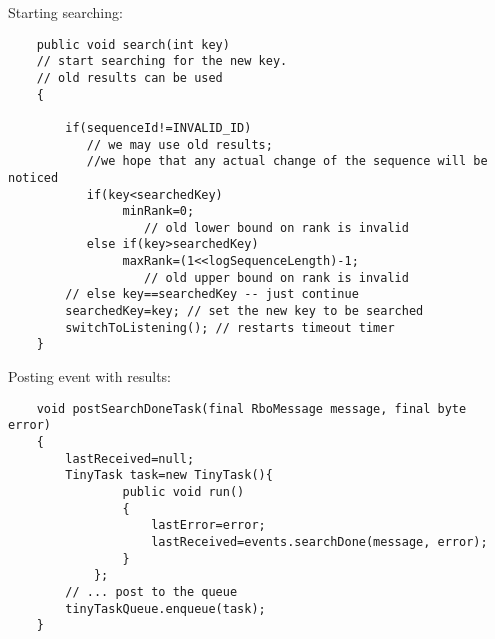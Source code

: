 \documentclass{letter}
\begin{document}
Starting searching:
\begin{verbatim}
    public void search(int key) 
    // start searching for the new key. 
    // old results can be used
    {

        if(sequenceId!=INVALID_ID) 
           // we may use old results; 
           //we hope that any actual change of the sequence will be noticed
           if(key<searchedKey)
                minRank=0; 
                   // old lower bound on rank is invalid
           else if(key>searchedKey)
                maxRank=(1<<logSequenceLength)-1; 
                   // old upper bound on rank is invalid
        // else key==searchedKey -- just continue
        searchedKey=key; // set the new key to be searched
        switchToListening(); // restarts timeout timer
    }
\end{verbatim}
Posting event with results:


\begin{verbatim}
    void postSearchDoneTask(final RboMessage message, final byte error)
    {
        lastReceived=null;
        TinyTask task=new TinyTask(){
                public void run()
                {
                    lastError=error;
                    lastReceived=events.searchDone(message, error);
                }
            };
        // ... post to the queue
        tinyTaskQueue.enqueue(task);
    }
\end{verbatim}
\end{document}
